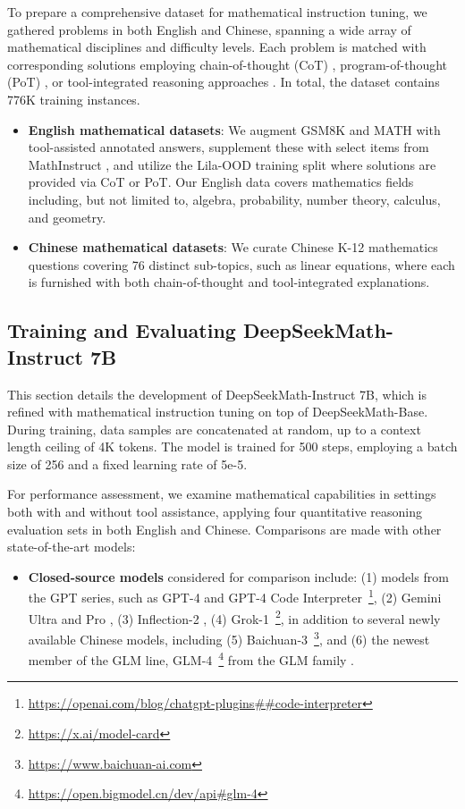 To prepare a comprehensive dataset for mathematical instruction tuning, we gathered problems in both English and Chinese, spanning a wide array of mathematical disciplines and difficulty levels. Each problem is matched with corresponding solutions employing chain-of-thought (CoT) \citep{cot}, program-of-thought (PoT) \citep{pot,pal}, or tool-integrated reasoning approaches \citep{tora}. In total, the dataset contains 776K training instances.

\begin{itemize}[topsep=0pt]
    \item \textbf{English mathematical datasets}: We augment GSM8K and MATH with tool-assisted annotated answers, supplement these with select items from MathInstruct \citep{MathInstruct}, and utilize the Lila-OOD training split \citep{lila} where solutions are provided via CoT or PoT. Our English data covers mathematics fields including, but not limited to, algebra, probability, number theory, calculus, and geometry.
    \item \textbf{Chinese mathematical datasets}: We curate Chinese K-12 mathematics questions covering 76 distinct sub-topics, such as linear equations, where each is furnished with both chain-of-thought and tool-integrated explanations.
\end{itemize}

\subsection{Training and Evaluating DeepSeekMath-Instruct 7B}

This section details the development of DeepSeekMath-Instruct 7B, which is refined with mathematical instruction tuning on top of DeepSeekMath-Base. During training, data samples are concatenated at random, up to a context length ceiling of 4K tokens. The model is trained for 500 steps, employing a batch size of 256 and a fixed learning rate of 5e-5.

For performance assessment, we examine mathematical capabilities in settings both with and without tool assistance, applying four quantitative reasoning evaluation sets in both English and Chinese. Comparisons are made with other state-of-the-art models:

\begin{itemize}[topsep=0pt]
    \item \textbf{Closed-source models} considered for comparison include: (1) models from the GPT series, such as GPT-4 \citep{gpt4} and GPT-4 Code Interpreter~\footnote{\url{https://openai.com/blog/chatgpt-plugins\#\#code-interpreter}}, (2) Gemini Ultra and Pro \citep{gemini}, (3) Inflection-2 \citep{inflection-2}, (4) Grok-1~\footnote{\url{https://x.ai/model-card}}, in addition to several newly available Chinese models, including (5) Baichuan-3~\footnote{\url{https://www.baichuan-ai.com}}, and (6) the newest member of the GLM line, GLM-4~\footnote{\url{https://open.bigmodel.cn/dev/api\#glm-4}} from the GLM family \citep{glm}.
\end{itemize}

